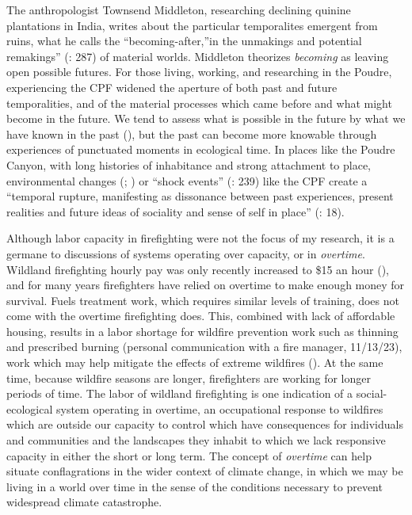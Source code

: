 \documentclass[
]{article}
\begin{document}
The anthropologist Townsend Middleton, researching declining quinine plantations in India, writes about the particular temporalites emergent from ruins, what he calls the ``becoming-after,''in the unmakings and potential remakings'' (: 287) of material worlds. Middleton theorizes \emph{becoming} as leaving open possible futures. For those living, working, and researching in the Poudre, experiencing the CPF widened the aperture of both past and future temporalities, and of the material processes which came before and what might become in the future. We tend to assess what is possible in the future by what we have known in the past (), but the past can become more knowable through experiences of punctuated moments in ecological time. In places like the Poudre Canyon, with long histories of inhabitance and strong attachment to place, environmental changes (; ) or ``shock events'' (: 239) like the CPF create a ``temporal rupture, manifesting as dissonance between past experiences, present realities and future ideas of sociality and sense of self in place'' (: 18).

Although labor capacity in firefighting were not the focus of my research, it is a germane to discussions of systems operating over capacity, or in \emph{overtime}. Wildland firefighting hourly pay was only recently increased to \$15 an hour (), and for many years firefighters have relied on overtime to make enough money for survival. Fuels treatment work, which requires similar levels of training, does not come with the overtime firefighting does. This, combined with lack of affordable housing, results in a labor shortage for wildfire prevention work such as thinning and prescribed burning (personal communication with a fire manager, 11/13/23), work which may help mitigate the effects of extreme wildfires (). At the same time, because wildfire seasons are longer, firefighters are working for longer periods of time. The labor of wildland firefighting is one indication of a social-ecological system operating in overtime, an occupational response to wildfires which are outside our capacity to control which have consequences for individuals and communities and the landscapes they inhabit to which we lack responsive capacity in either the short or long term. The concept of \emph{overtime} can help situate conflagrations in the wider context of climate change, in which we may be living in a world over time in the sense of the conditions necessary to prevent widespread climate catastrophe.
\end{document}
